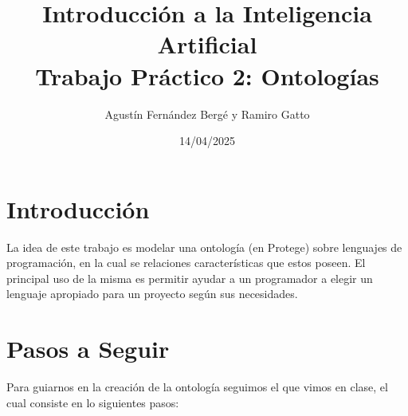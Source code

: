 \documentclass[12pt, titlepage, a4paper]{article}
\title{Introducción a la Inteligencia Artificial \\
Trabajo Práctico 2: Ontologías }
\author{Agustín Fernández Bergé y Ramiro Gatto}
\date{14/04/2025}
\begin{document}
\maketitle

\section{Introducción}
La idea de este trabajo es modelar una ontología 
(en Protege) sobre lenguajes de  
programación, en la cual se relaciones características que estos 
poseen. El principal uso de la misma es permitir ayudar a un programador
a elegir un lenguaje apropiado para un proyecto según sus necesidades. 

\section{Pasos a Seguir}
Para guiarnos en la creación de la ontología seguimos el  que 
vimos en clase, el cual consiste en lo siguientes pasos:
\end{document}
